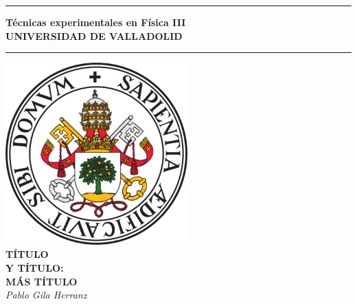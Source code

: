 \documentclass[12pt,a4paper]{article}
\begin{document}
\begin{titlepage} %
\begin{center} %
\vspace*{2\baselineskip} %
\hrule height 3pt
\vspace*{0.5\baselineskip}
{\Huge \textbf{Técnicas experimentales en Física III}}\\[0.1cm]
{\large \textbf{UNIVERSIDAD DE VALLADOLID}}
\vspace*{0.5\baselineskip}
\hrule
\vspace*{6\baselineskip}
\includegraphics[width=7cm]{fotos/escudo}\\
\vspace*{4.5\baselineskip}
{\Huge \textbf{TÍTULO\\Y TÍTULO:\\[0.5cm]MÁS TÍTULO\\}}
\vfill %
\textit{Pablo Gila Herranz}\\
\end{center}
\end{titlepage}

\tableofcontents
\thispagestyle{empty} %
\newpage
\setcounter{page}{1} %
\end{document}

